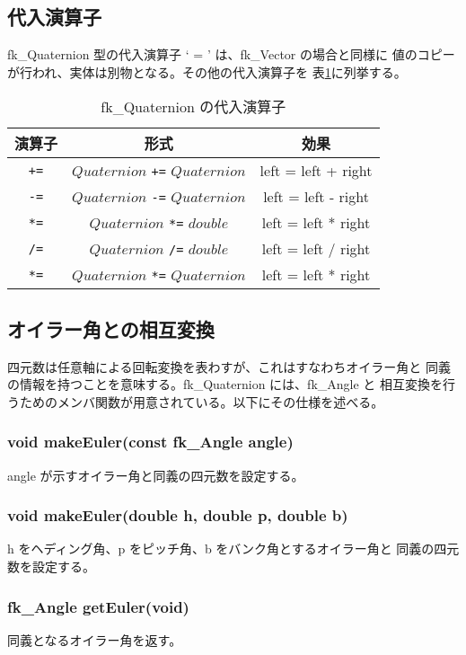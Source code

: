 \subsection{代入演算子}
fk\_Quaternion 型の代入演算子 ` = ' は、fk\_Vector の場合と同様に
値のコピーが行われ、実体は別物となる。その他の代入演算子を
表\ref{tbl:fkQ3}に列挙する。
\begin{table}[H]
\caption{fk\_Quaternion の代入演算子}
\label{tbl:fkQ3}
\begin{center}
\begin{tabular}{|c|c|c|}
\hline
演算子 & 形式 & 効果 \\ \hline \hline
\verb-+=- & \(Quaternion\) \verb-+=- \(Quaternion\) &
	left = left + right \\ \hline
\verb+-=+ & \(Quaternion\) \verb+-=+ \(Quaternion\) &
	left = left - right \\ \hline
\verb+*=+ & \(Quaternion\) \verb+*=+ \(double\) &
	left = left * right \\ \hline
\verb+/=+ & \(Quaternion\) \verb+/=+ \(double\) &
	left = left / right \\ \hline
\verb+*=+ & \(Quaternion\) \verb+*=+ \(Quaternion\) &
	left = left * right \\ \hline
\end{tabular}
\end{center}
\end{table}
\subsection{オイラー角との相互変換}
四元数は任意軸による回転変換を表わすが、これはすなわちオイラー角と
同義の情報を持つことを意味する。fk\_Quaternion には、fk\_Angle と
相互変換を行うためのメンバ関数が用意されている。以下にその仕様を述べる。

\subsubsection*{void makeEuler(const fk\_Angle angle)}
angle が示すオイラー角と同義の四元数を設定する。

\subsubsection*{void makeEuler(double h, double p, double b)}
h をヘディング角、p をピッチ角、b をバンク角とするオイラー角と
同義の四元数を設定する。

\subsubsection*{fk\_Angle getEuler(void)}
同義となるオイラー角を返す。

